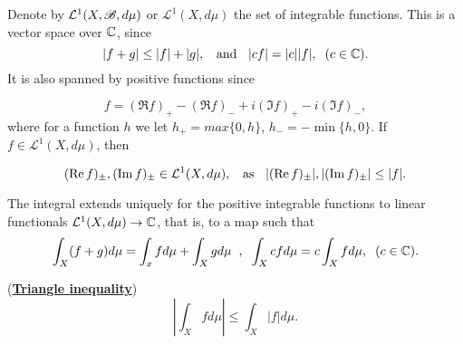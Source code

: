 Denote by $\mathcal L^1(X,\mathscr{B},d\mu)$ or $\mathcal L^1(X,d\mu)$ the set of integrable functions. This is a vector space over $\mathbb{C}$, since
\[ |f+g|\leq |f|+|g|,\hspace{2mm} \text{ and }\hspace{2mm} |cf|=|c||f|,\hspace{2mm} (c\in\mathbb{C}). \]
It is also spanned by positive functions since 

\[f = (\Re f)_+ - (\Re f)_- +i(\Im f)_+ - i(\Im f)_-,\]
where for a function $h$ we let $h_+ = max\{0,h\}$, $h_- = -\min\{h,0\}$. If $f\in \mathcal L^1(X,d\mu)$, then 

\[(\Re f)_\pm,(\Im f)_\pm\in\mathcal L^1(X,d\mu),\hspace{2mm}\text{ as }\hspace{2mm} |(\Re f)_\pm|,|(\Im f)_\pm|\leq |f|.\]

\begin{proposition}
    The integral extends uniquely for the positive integrable functions to linear functionals $\mathcal L^1(X,d\mu)\rightarrow \mathbb{C}$, that is, to a map such that 
    \[\int_X (f+g)d\mu = \int_x fd\mu+\int_X gd\mu\hspace{2mm},\hspace{2mm} \int_X cfd\mu = c\int_Xfd\mu,\hspace{2mm} (c\in \mathbb{C}).\]
\end{proposition}


\begin{proposition}(\underline{\textbf{Triangle inequality}})
    \[\left| \int_X fd\mu \right|\leq \int_X|f|d\mu.\]
    
\end{proposition}